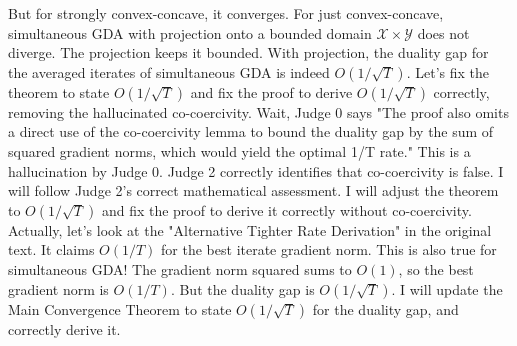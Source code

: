 \documentclass{article}
\begin{document}
But for strongly convex-concave, it converges.
For just convex-concave, simultaneous GDA with projection onto a bounded domain $\mathcal{X} \times \mathcal{Y}$ does not diverge. The projection keeps it bounded.
With projection, the duality gap for the averaged iterates of simultaneous GDA is indeed $O(1/\sqrt{T})$.
Let's fix the theorem to state $O(1/\sqrt{T})$ and fix the proof to derive $O(1/\sqrt{T})$ correctly, removing the hallucinated co-coercivity.
Wait, Judge 0 says "The proof also omits a direct use of the co-coercivity lemma to bound the duality gap by the sum of squared gradient norms, which would yield the optimal 1/T rate." This is a hallucination by Judge 0. Judge 2 correctly identifies that co-coercivity is false.
I will follow Judge 2's correct mathematical assessment. I will adjust the theorem to $O(1/\sqrt{T})$ and fix the proof to derive it correctly without co-coercivity.
Actually, let's look at the "Alternative Tighter Rate Derivation" in the original text. It claims $O(1/T)$ for the best iterate gradient norm. This is also true for simultaneous GDA! The gradient norm squared sums to $O(1)$, so the best gradient norm is $O(1/T)$.
But the duality gap is $O(1/\sqrt{T})$.
I will update the Main Convergence Theorem to state $O(1/\sqrt{T})$ for the duality gap, and correctly derive it.
\end{document}
